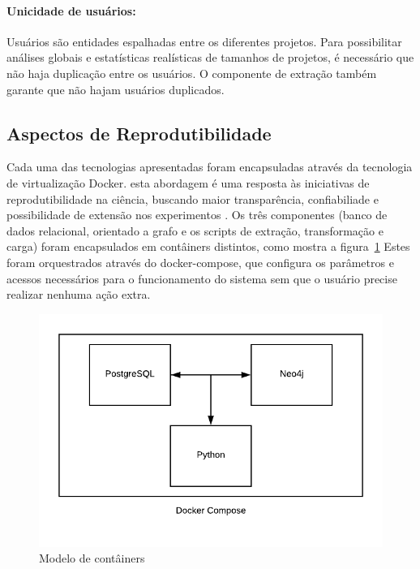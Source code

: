\documentclass[sigconf]{acmart}
\begin{document}
\paragraph{Unicidade de usuários: } Usuários são entidades espalhadas entre os diferentes projetos. Para possibilitar análises globais e estatísticas realísticas de tamanhos de projetos, é necessário que não haja duplicação entre os usuários. O componente de extração também garante que não hajam usuários duplicados.



\subsection{Aspectos de Reprodutibilidade}

Cada uma das tecnologias apresentadas foram encapsuladas através da tecnologia de virtualização Docker. esta abordagem é uma resposta às iniciativas de reprodutibilidade na ciência, buscando maior transparência, confiabiliade e possibilidade de extensão nos experimentos \cite{freire2012}. Os três componentes (banco de dados relacional, orientado a grafo e os scripts de extração, transformação e carga) foram encapsulados em contâiners distintos, como mostra a figura~\ref{fig:docker-model} Estes foram orquestrados através do docker-compose, que configura os parâmetros e acessos necessários para o funcionamento do sistema sem que o usuário precise realizar nenhuma ação extra.

\begin{figure}[!htbp]
 \includegraphics[width=\columnwidth]{docker-model}
 \caption{Modelo de contâiners}\label{fig:docker-model}
\end{figure}
\end{document}
